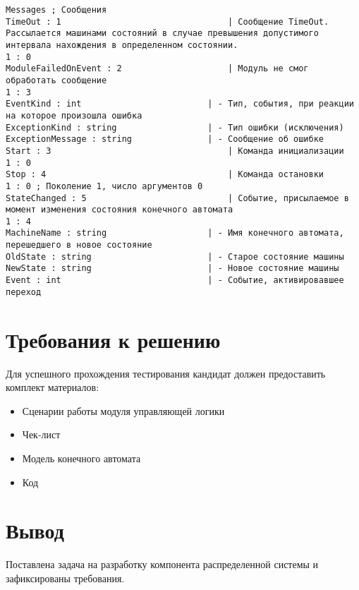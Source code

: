 	\begin{lstlisting}
Messages ; Сообщения
TimeOut : 1                                 | Сообщение TimeOut. Рассылается машинами состояний в случае превышения допустимого интервала нахождения в определенном состоянии.
1 : 0
ModuleFailedOnEvent : 2                     | Модуль не смог обработать сообщение
1 : 3
EventKind : int                         | - Тип, события, при реакции на которое произошла ошибка
ExceptionKind : string                  | - Тип ошибки (исключения)
ExceptionMessage : string               | - Сообщение об ошибке
Start : 3                                   | Команда инициализации
1 : 0
Stop : 4                                    | Команда остановки
1 : 0 ; Поколение 1, число аргументов 0
StateChanged : 5                            | Событие, присылаемое в момент изменения состояния конечного автомата
1 : 4
MachineName : string                    | - Имя конечного автомата, перешедшего в новое состояние
OldState : string                       | - Старое состояние машины
NewState : string                       | - Новое состояние машины
Event : int                             | - Событие, активировавшее переход
	\end{lstlisting}
	
	\section{Требования к решению}
	Для успешного прохождения тестирования кандидат должен предоставить комплект материалов:
	
	\begin{itemize}
		\item Сценарии работы модуля управляющей логики
		\item Чек-лист
		\item Модель конечного автомата
		\item Код
	\end{itemize}
	
	\section{Вывод}
		Поставлена задача на разработку компонента распределенной системы и зафиксированы требования.